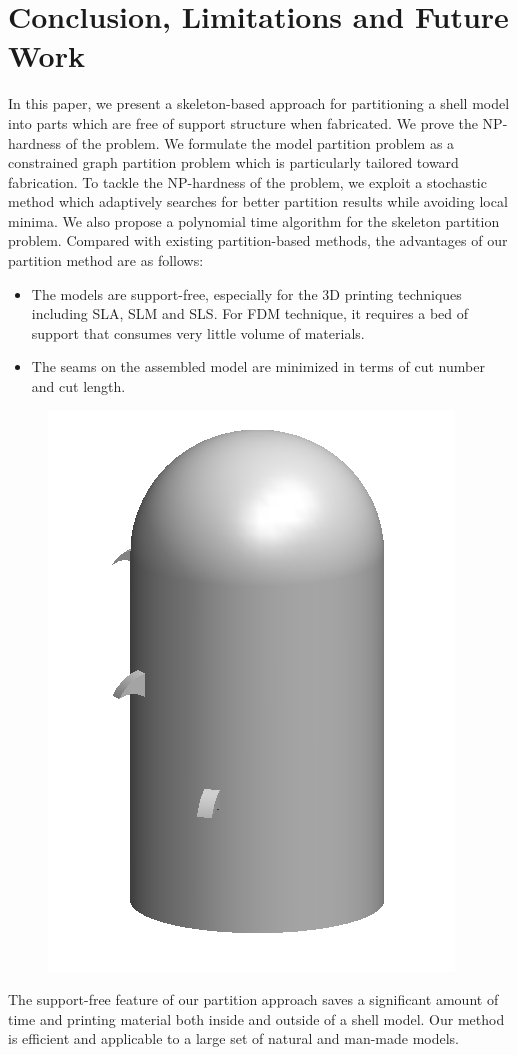 \section{Conclusion, Limitations and Future Work}

In this paper, we present a skeleton-based approach for partitioning a shell model into parts which are free of support structure when fabricated. We prove the NP-hardness of the problem. We formulate the model partition problem as a constrained graph partition problem which is particularly tailored toward fabrication. To tackle the NP-hardness of the problem, we exploit a stochastic method which adaptively searches for better partition results while avoiding local minima. We also propose a polynomial time algorithm for the skeleton partition problem.
Compared with existing partition-based methods, the advantages of our partition method are as follows:

\begin{itemize}
 \item The models are support-free, especially for the 3D printing techniques including SLA, SLM and SLS. For FDM technique, it requires a bed of support that consumes very little volume of materials.
\item The seams on the assembled model are minimized in terms of cut number and cut length.
\end{itemize}

\begin{figure} %
\vspace{-.1in}
\includegraphics[width=0.3\columnwidth]{figs/limit.png}
\end{figure}
The support-free feature of our partition approach saves a significant amount of time and printing material both inside and outside of a shell model. Our method is efficient and applicable to a large set of natural and man-made models.

